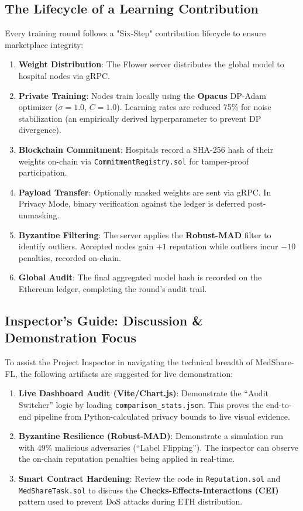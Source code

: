 \documentclass[10pt, a4paper, twocolumn]{article}
\begin{document}
\subsection{The Lifecycle of a Learning Contribution}
Every training round follows a "Six-Step" contribution lifecycle to ensure marketplace integrity:
\begin{enumerate}
    \item \textbf{Weight Distribution}: The Flower server distributes the global model to hospital nodes via gRPC.
    \item \textbf{Private Training}: Nodes train locally using the \textbf{Opacus} DP-Adam optimizer ($\sigma=1.0$, $C=1.0$). Learning rates are reduced 75\% for noise stabilization (an empirically derived hyperparameter to prevent DP divergence).
    \item \textbf{Blockchain Commitment}: Hospitals record a SHA-256 hash of their weights on-chain via \texttt{CommitmentRegistry.sol} for tamper-proof participation.
    \item \textbf{Payload Transfer}: Optionally masked weights are sent via gRPC. In Privacy Mode, binary verification against the ledger is deferred post-unmasking.
    \item \textbf{Byzantine Filtering}: The server applies the \textbf{Robust-MAD} filter to identify outliers. Accepted nodes gain $+1$ reputation while outliers incur $-10$ penalties, recorded on-chain.
    \item \textbf{Global Audit}: The final aggregated model hash is recorded on the Ethereum ledger, completing the round's audit trail.
\end{enumerate}

\subsection{Inspector's Guide: Discussion \& Demonstration Focus}
To assist the Project Inspector in navigating the technical breadth of MedShare-FL, the following artifacts are suggested for live demonstration:

\begin{enumerate}
    \item \textbf{Live Dashboard Audit (Vite/Chart.js)}: Demonstrate the ``Audit Switcher'' logic by loading \texttt{comparison\_stats.json}. This proves the end-to-end pipeline from Python-calculated privacy bounds to live visual evidence.
    \item \textbf{Byzantine Resilience (Robust-MAD)}: Demonstrate a simulation run with 49\% malicious adversaries (``Label Flipping''). The inspector can observe the on-chain reputation penalties being applied in real-time.
    \item \textbf{Smart Contract Hardening}: Review the code in \texttt{Reputation.sol} and \texttt{MedShareTask.sol} to discuss the \textbf{Checks-Effects-Interactions (CEI)} pattern used to prevent DoS attacks during ETH distribution.
\end{enumerate}
\end{document}
